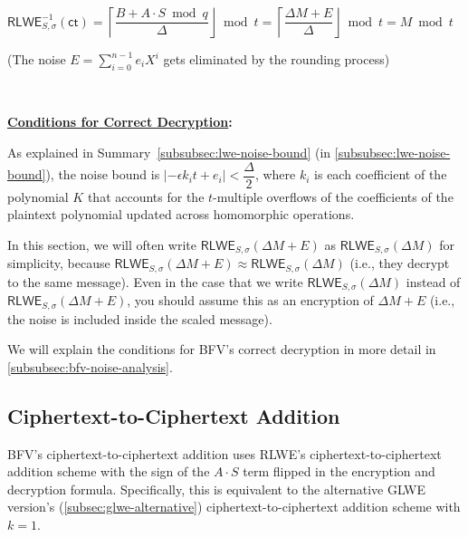\begin{tcolorbox}[title={\textbf{\tboxlabel{\ref*{subsec:bfv-enc-dec}} BFV Encryption and Decryption}}]
$\textsf{RLWE}^{-1}_{S,\sigma}(\textsf{ct}) = \left\lceil\dfrac{B + A \cdot S \bmod q}{\Delta}\right\rfloor \bmod t = \left\lceil\dfrac{\Delta M + E}{\Delta}\right\rfloor \bmod t = M \bmod t$

(The noise $E = \sum\limits_{i=0}^{n-1}e_iX^i$ gets eliminated by the rounding process) 



$ $

\textbf{\underline{Conditions for Correct Decryption}:}

As explained in Summary~\ref*{subsubsec:lwe-noise-bound} (in \autoref{subsubsec:lwe-noise-bound}), the noise bound is $|-\epsilon k_i t + e_i| < \dfrac{\Delta}{2}$, where $k_i$ is each coefficient of the polynomial $K$ that accounts for the $t$-multiple overflows of the coefficients of the plaintext polynomial updated across homomorphic operations. 

\end{tcolorbox}


In this section, we will often write $\textsf{RLWE}_{S,\sigma}(\Delta  M + E)$ as $\textsf{RLWE}_{S,\sigma}(\Delta  M)$ for simplicity, because $\textsf{RLWE}_{S,\sigma}(\Delta M + E) \approx \textsf{RLWE}_{S,\sigma}(\Delta M)$ (i.e., they decrypt to the same message). Even in the case that we write $\textsf{RLWE}_{S,\sigma}(\Delta  M)$ instead of $\textsf{RLWE}_{S,\sigma}(\Delta  M + E)$, you should assume this as an encryption of $\Delta  M + E$ (i.e., the noise is included inside the scaled message). 


We will explain the conditions for BFV's correct decryption in more detail in \autoref{subsubsec:bfv-noise-analysis}.



\subsection{Ciphertext-to-Ciphertext Addition}
\label{subsec:bfv-add-cipher}

BFV's ciphertext-to-ciphertext addition uses RLWE's ciphertext-to-ciphertext addition scheme with the sign of the $A\cdot S$ term flipped in the encryption and decryption formula. Specifically, this is equivalent to the alternative GLWE version's (\autoref{subsec:glwe-alternative}) ciphertext-to-ciphertext addition scheme with $k = 1$. 


